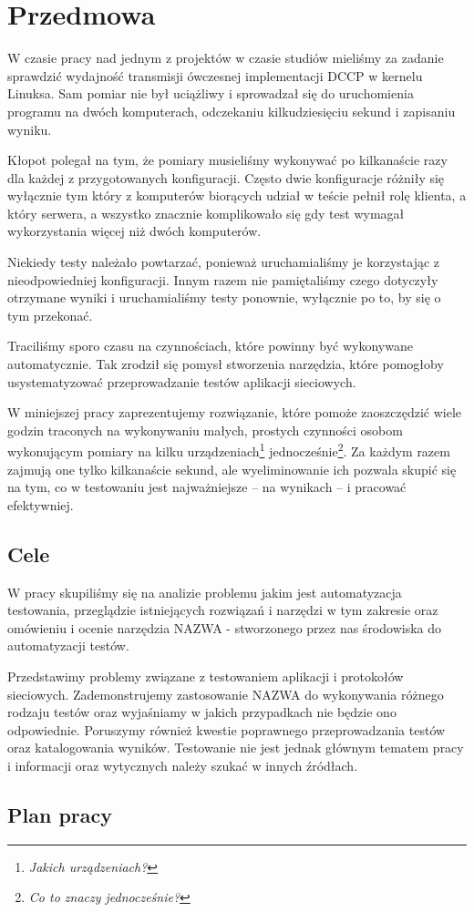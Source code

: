 \documentclass[00-praca-magisterska.tex]{subfiles}
\begin{document}
\chapter{Przedmowa}

W czasie pracy nad jednym z projektów w czasie studiów mieliśmy za zadanie
sprawdzić wydajność transmisji ówczesnej implementacji DCCP w kernelu Linuksa.
Sam pomiar nie był uciążliwy i sprowadzał się do uruchomienia programu na dwóch
komputerach, odczekaniu kilkudziesięciu sekund i zapisaniu wyniku.

Kłopot polegał na tym, że pomiary musieliśmy wykonywać po kilkanaście razy dla
każdej z przygotowanych konfiguracji. Często dwie konfiguracje różniły się
wyłącznie tym który z komputerów biorących udział w teście pełnił rolę klienta,
a który serwera, a wszystko znacznie komplikowało się gdy test wymagał
wykorzystania więcej niż dwóch komputerów.

Niekiedy testy należało powtarzać, ponieważ uruchamialiśmy je korzystając z
nieodpowiedniej konfiguracji. Innym razem nie pamiętaliśmy czego dotyczyły
otrzymane wyniki i uruchamialiśmy testy ponownie, wyłącznie po to, by się o tym
przekonać.

Traciliśmy sporo czasu na czynnościach, które powinny być wykonywane
automatycznie. Tak zrodził się pomysł stworzenia narzędzia, które
pomogłoby usystematyzować przeprowadzanie testów aplikacji sieciowych.

W miniejszej pracy zaprezentujemy rozwiązanie, które pomoże zaoszczędzić wiele
godzin traconych na wykonywaniu małych, prostych czynności osobom wykonującym
pomiary na kilku urządzeniach\footnote{\emph{Jakich urządzeniach?}}
jednocześnie\footnote{\emph{Co to znaczy jednocześnie?}}. Za każdym razem
zajmują one tylko kilkanaście sekund, ale wyeliminowanie ich pozwala skupić się
na tym, co w testowaniu jest najważniejsze -- na wynikach -- i pracować
efektywniej.

\section{Cele}


W pracy skupiliśmy się na analizie problemu jakim jest automatyzacja
testowania, przeglądzie istniejących rozwiązań i narzędzi w tym zakresie oraz
omówieniu i ocenie narzędzia NAZWA - stworzonego przez nas środowiska do
automatyzacji testów.

Przedstawimy problemy związane z testowaniem aplikacji i protokołów sieciowych.
Zademonstrujemy zastosowanie NAZWA do wykonywania różnego rodzaju testów oraz
wyjaśniamy w jakich przypadkach nie będzie ono odpowiednie.  Poruszymy również
kwestie poprawnego przeprowadzania testów oraz katalogowania wyników.
Testowanie nie jest jednak głównym tematem pracy i informacji oraz wytycznych
należy szukać w innych źródłach.

\section{Plan pracy}

\end{document}
